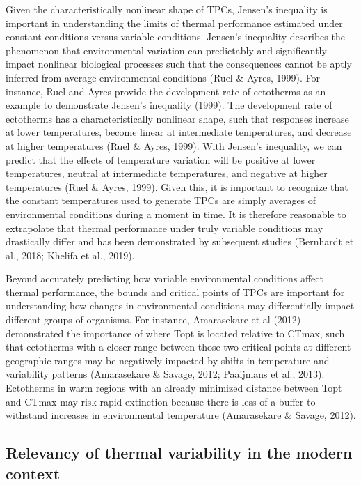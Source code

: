 \documentclass[12pt,twoside]{reedthesis}
\begin{document}
Given the characteristically nonlinear shape of TPCs, Jensen's inequality is important in understanding the limits of thermal performance estimated under constant conditions versus variable conditions. Jensen's inequality describes the phenomenon that environmental variation can predictably and significantly impact nonlinear biological processes such that the consequences cannot be aptly inferred from average environmental conditions (Ruel \& Ayres, 1999). For instance, Ruel and Ayres provide the development rate of ectotherms as an example to demonstrate Jensen's inequality (1999). The development rate of ectotherms has a characteristically nonlinear shape, such that responses increase at lower temperatures, become linear at intermediate temperatures, and decrease at higher temperatures (Ruel \& Ayres, 1999). With Jensen's inequality, we can predict that the effects of temperature variation will be positive at lower temperatures, neutral at intermediate temperatures, and negative at higher temperatures (Ruel \& Ayres, 1999). Given this, it is important to recognize that the constant temperatures used to generate TPCs are simply averages of environmental conditions during a moment in time. It is therefore reasonable to extrapolate that thermal performance under truly variable conditions may drastically differ and has been demonstrated by subsequent studies (Bernhardt et al., 2018; Khelifa et al., 2019).

Beyond accurately predicting how variable environmental conditions affect thermal performance, the bounds and critical points of TPCs are important for understanding how changes in environmental conditions may differentially impact different groups of organisms. For instance, Amarasekare et al (2012) demonstrated the importance of where Topt is located relative to CTmax, such that ectotherms with a closer range between those two critical points at different geographic ranges may be negatively impacted by shifts in temperature and variability patterns (Amarasekare \& Savage, 2012; Paaijmans et al., 2013). Ectotherms in warm regions with an already minimized distance between Topt and CTmax may risk rapid extinction because there is less of a buffer to withstand increases in environmental temperature (Amarasekare \& Savage, 2012).

\hypertarget{relevancy-of-thermal-variability-in-the-modern-context}{%
\subsection{Relevancy of thermal variability in the modern context}\label{relevancy-of-thermal-variability-in-the-modern-context}}
\end{document}

